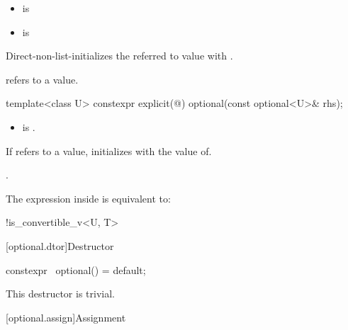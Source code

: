 \documentclass[a4paper,10pt,oneside,openany,final,article]{memoir}
\begin{document}
\begin{wording}
\begin{itemdescr}
    \pnum
    \mandates
    \begin{itemize}
    \item {} is 
    \item {} is 
    \end{itemize}

    \pnum
    \effects
    Direct-non-list-initializes the referred to value with .

    \pnum
    \ensures
     refers to a value.

  \end{itemdescr}

  \begin{itemdecl}
    template<class U> constexpr explicit(@\seebelow@) optional(const optional<U>& rhs);
  \end{itemdecl}

  \begin{itemdescr}
    \pnum
    \constraints
    \begin{itemize}
    \item {} is .
    \end{itemize}

    \pnum
    \effects
    If  refers to a value,
    initializes  with the value of.

    \pnum
    \ensures
    .

    \pnum
    \remarks
    The expression inside  is equivalent to:
    \begin{codeblock}
      !is_convertible_v<U, T>
    \end{codeblock}

  \end{itemdescr}


  [optional.dtor]{Destructor}

  \begin{itemdecl}
    constexpr ~optional() = default;
  \end{itemdecl}
\begin{itemdescr}
\pnum
\remarks
This destructor is trivial.
\end{itemdescr}

  [optional.assign]{Assignment}


\end{wording}
\end{document}
